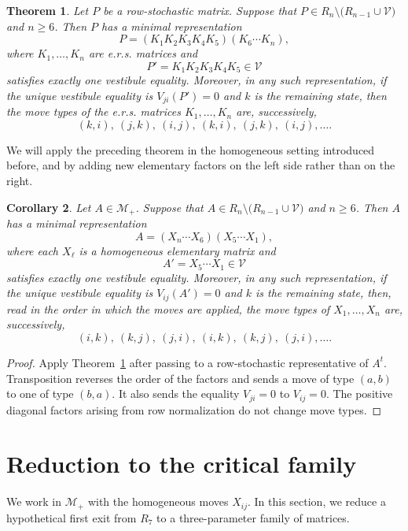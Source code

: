 \documentclass[11pt,onecolumn]{amsart}
\theoremstyle{plain}
\newtheorem{theorem}{Theorem}[section]
\newtheorem{corollary}[theorem]{Corollary}
\theoremstyle{definition}
\theoremstyle{remark}
\newcommand{\V}{\mathcal V}
\begin{document}
\begin{theorem}
	\label{thm:Frydman-spiral}
	Let $P$ be a row-stochastic matrix. Suppose  that
	$P\in R_n\setminus\bigl(R_{n-1}\cup\V\bigr)$ and   $n\geq 6$.
	Then $P$ has a minimal representation
	\[
	P=(K_1K_2K_3K_4K_5)(K_6\cdots K_n),
	\]
	where 	$K_1,\ldots,K_n$ are e.r.s. matrices and
	\[
	P'=K_1K_2K_3K_4K_5\in\V
	\]
	satisfies exactly one vestibule equality. Moreover, in any such
	representation, if the unique vestibule equality is $V_{ji}(P')=0$ and $k$ is the remaining state, then the move types of the e.r.s. matrices 
	$K_1,\ldots,K_n$ are, successively,
	\[
	(k,i),\ (j,k),\ (i,j),\ (k,i),\ (j,k),\ (i,j),\ldots .
	\]
\end{theorem}

We will apply the preceding theorem in the homogeneous setting introduced before, and by adding new elementary factors on the left  side rather than on the right.

\begin{corollary}
	\label{cor:left-Frydman-spiral}
Let $A\in \mathcal M_+$.  Suppose that $A\in R_n\setminus\bigl(R_{n-1}\cup\V\bigr)$
 and $n\geq 6$.
	Then $A$ has a minimal representation
	\[
	A=(X_n\cdots X_6)(X_5\cdots X_1),
	\]
	where each $X_\ell$ is a homogeneous elementary matrix and
	\[
	A'=X_5\cdots X_1\in\V
	\]
	satisfies exactly one vestibule equality. Moreover, in any such
	representation, if the unique vestibule equality is
	$V_{ij}(A')=0$ and $k$ is the remaining state, then, read in the order in which the moves are applied, the move types of
	$X_1,\ldots,X_n$ are, successively,
	\[
	(i,k),\ (k,j),\ (j,i),\ (i,k),\ (k,j),\ (j,i),\ldots .
	\]
\end{corollary}

\begin{proof}
	Apply Theorem~\ref{thm:Frydman-spiral} after passing to a
	row-stochastic representative of $A^t$. Transposition reverses the
	order of the factors and sends a move of type $(a,b)$ to one of type
	$(b,a)$. It also sends the equality $V_{ji}=0$ to $V_{ij}=0$.
	The positive diagonal factors arising from row normalization do not
	change move types.
\end{proof}




\section{Reduction to the critical family}
\label{sec:critical-reduction}

We work in $\mathcal M_+$ with the homogeneous moves $X_{ij}$. In this section, we
reduce a hypothetical first exit from $R_7$ to a three-parameter
family of matrices.
\end{document}
